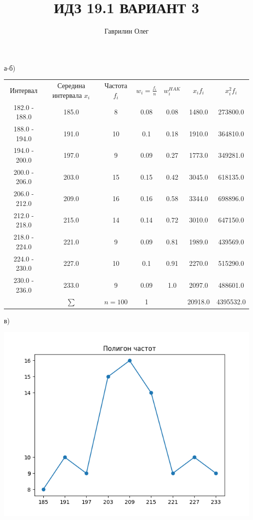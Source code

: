 \documentclass[10pt]{article}
\title{ИДЗ 19.1 ВАРИАНТ 3}
\author{Гаврилин Олег}
\begin{document}
\maketitle

а-б)
\begin{center}
\begin{tabular}{ |c|c|c|c|c|c|c| }
\hline
Интервал & Середина интервала $x_i$ & Частота $f_i$ & $w_i=\frac{f_i}{n}$ & $w_i^{HAK}$ & $x_if_i$ & $x_i^2f_i$ \\
182.0 - 188.0 & 185.0 & 8 & 0.08 & 0.08 & 1480.0 & 273800.0 \\
188.0 - 194.0 & 191.0 & 10 & 0.1 & 0.18 & 1910.0 & 364810.0 \\
194.0 - 200.0 & 197.0 & 9 & 0.09 & 0.27 & 1773.0 & 349281.0 \\
200.0 - 206.0 & 203.0 & 15 & 0.15 & 0.42 & 3045.0 & 618135.0 \\
206.0 - 212.0 & 209.0 & 16 & 0.16 & 0.58 & 3344.0 & 698896.0 \\
212.0 - 218.0 & 215.0 & 14 & 0.14 & 0.72 & 3010.0 & 647150.0 \\
218.0 - 224.0 & 221.0 & 9 & 0.09 & 0.81 & 1989.0 & 439569.0 \\
224.0 - 230.0 & 227.0 & 10 & 0.1 & 0.91 & 2270.0 & 515290.0 \\
230.0 - 236.0 & 233.0 & 9 & 0.09 & 1.0 & 2097.0 & 488601.0 \\
\quad & $\sum$ & $n=100$ & 1 & \quad & 20918.0 & 4395532.0 \\
\hline
\end{tabular}
\end{center}

в)

\centerline{\includegraphics[scale=0.7]{1.png}}
\end{document}
